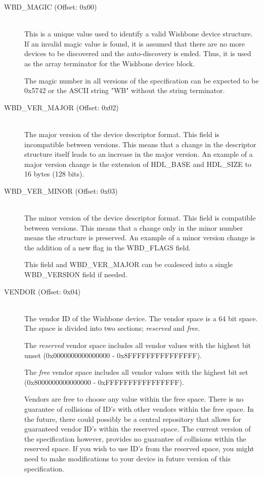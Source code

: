 \documentclass{article}
\begin{document}
\begin{description}
\item[WBD\_MAGIC (Offset: 0x00)] \hfill \\
This is a unique value used to identify a valid Wishbone device structure. If
an invalid magic value is found, it is assumed that there are no more devices
to be discovered and the auto-discovery is ended. Thus, it is used as the array
terminator for the Wishbone device block.

The magic number in all versions of the specification can be expected to
be 0x5742 or the ASCII string "WB" without the string terminator.

\item[WBD\_VER\_MAJOR (Offset: 0x02)] \hfill \\
The major version of the device descriptor format. This field is incompatible
between versions. This means that a change in the descriptor structure itself
leads to an increase in the major version. An example of a major version change
is the extension of HDL\_BASE and HDL\_SIZE to 16 bytes (128 bits).

\item[WBD\_VER\_MINOR (Offset: 0x03)] \hfill \\
The minor version of the device descriptor format. This field is compatible
between versions. This means that a change only in the minor number means the
structure is preserved. An example of a minor version change is the addition
of a new flag in the WBD\_FLAGS field.

This field and WBD\_VER\_MAJOR can be coalesced into a single WBD\_VERSION
field if needed.

\item[VENDOR (Offset: 0x04)] \hfill \\
The vendor ID of the Wishbone device. The vendor space is a 64 bit space.
The space is divided into two sections; \emph{reserved} and \emph{free}.

The \emph{reserved} vendor space includes all vendor values with the highest 
bit unset (0x0000000000000000 - 0x8FFFFFFFFFFFFFFF).

The \emph{free} vendor space includes all vendor values with the highest 
bit set (0x8000000000000000 - 0xFFFFFFFFFFFFFFFF).

Vendors are free to choose any value within the free space. There is no
guarantee of collisions of ID's with other vendors within the free space.
In the future, there could possibly be a central repository that allows
for guaranteed vendor ID's within the reserved space. The current version
of the specification however, provides no guarantee of collisions within
the reserved space. If you wish to use ID's from the reserved space, you
might need to make modifications to your device in future version of this
specification.


\end{description}
\end{document}
